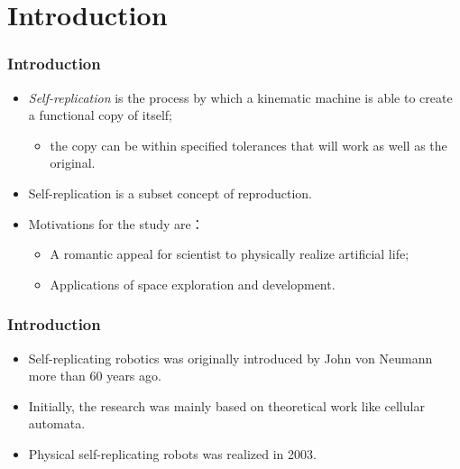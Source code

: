 \documentclass[14pt]{beamer}
\institute{Universit\"at Hamburg\\\trinstitute}
\title{\trtitle}
\subtitle{\trtype}
\author{\trauthor}
\date{}
\theoremstyle{remark}
\begin{document}
\renewcommand{\arraystretch}{1.2}

\begin{frame}[plain] %
  \titlepage
\end{frame}



\section{Introduction}

\begin{frame}
  \frametitle{Introduction}
  \begin{itemize}
  	\item \emph{Self-replication} is the process by which a kinematic machine is able to create a functional copy of itself;
  	\begin{itemize}
  	  \item the copy can be within specified tolerances that will work as well as the original\cite{jones_reprap_2011}.
  	\end{itemize}
  	\item Self-replication is a subset concept of reproduction.
\mbox{ }
  	\item Motivations for the study are：
  	\begin{itemize}
  	  \item A romantic appeal for scientist to physically realize artificial life;
  	  \item Applications of space exploration and development\cite{chirikjian_self-replicating_2002}.
  	\end{itemize}
	\end{itemize}
\end{frame}

\begin{frame}
  \frametitle{Introduction}
  \begin{itemize}
  	\item Self-replicating robotics was originally introduced by John von Neumann more than 60 years ago\cite{von_neumann_theory_1962}.
  	\item Initially, the research was mainly based on theoretical work like cellular automata.
  	\item Physical self-replicating robots was realized in 2003\cite{suthakorn_autonomous_2003}.
	\end{itemize}
\end{frame}
\end{document}
